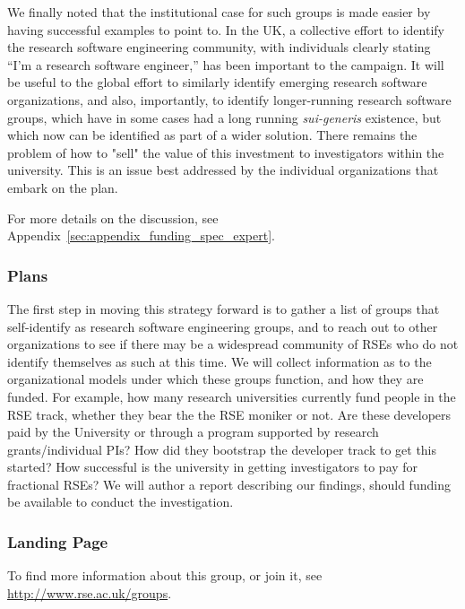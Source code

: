 We finally noted that the institutional case for such groups is made easier by having successful examples to point to. In the
UK, a collective effort to identify the research software engineering community, with individuals clearly stating ``I'm a research software engineer,'' has been important to the campaign. It will be useful to the global effort to similarly identify emerging research software organizations, and also, importantly, to identify longer-running research software groups, which have in some cases had a long running \emph{sui-generis} existence, but which now can be identified as part of a wider solution. There remains the problem of how to "sell" the value of this investment to investigators within the university. This is an issue best addressed by the individual organizations that embark on the plan. 

For more details on the discussion, see Appendix~\ref{sec:appendix_funding_spec_expert}.

\subsubsection{Plans}

The first step in moving this strategy forward is to gather a list of groups that self-identify as research software engineering groups, and to reach out to other organizations to see if there may be a widespread community of RSEs who do not identify themselves as such at this time. We will collect information as to the organizational models under which these groups function, and how they are funded. For example, how many research universities currently fund people in the RSE track, whether they bear the the RSE moniker or not. Are these developers paid by the University or through a program supported by research grants/individual PIs? How did they bootstrap the developer track to get this started? How successful is the university in getting investigators to pay for fractional RSEs?  We will author a report describing our findings, should funding be available to conduct the investigation. 

\subsubsection{Landing Page}

To find more information about this group, or join it, see \url{http://www.rse.ac.uk/groups}.
